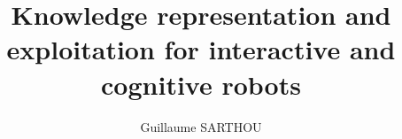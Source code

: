 %
%
%
% 
%



\title{\textbf{\large Knowledge representation and exploitation for interactive and cognitive robots}}
\author{Guillaume SARTHOU}

